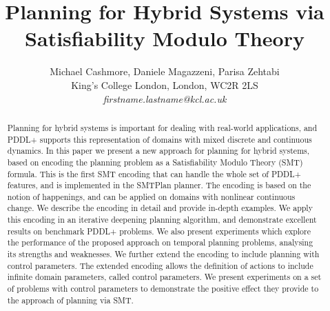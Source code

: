 \documentclass[letterpaper]{article}
\begin{document}
\title{Planning for Hybrid Systems via Satisfiability Modulo Theory}
\author{\center
 Michael Cashmore, Daniele Magazzeni, Parisa Zehtabi \\
King’s College London, London, WC2R 2LS \\
\textit{firstname.lastname@kcl.ac.uk} \\
}
\maketitle


\begin{abstract}
Planning for hybrid systems is important for dealing with real-world applications, and PDDL+ supports this representation of domains with mixed discrete and continuous dynamics.
%
In this paper we present a new approach for planning for hybrid systems, based on encoding the planning problem as a Satisfiability Modulo Theory (SMT) formula. This is the first SMT encoding that can handle the whole set of PDDL+ features, and is implemented in the SMTPlan planner. The encoding is based on the notion of happenings, and can be applied on domains with nonlinear continuous change. We describe the encoding in detail and provide in-depth examples.
%
We apply this encoding in an iterative deepening planning algorithm, and demonstrate excellent results on benchmark PDDL+ problems. We also present experiments which explore the performance of the proposed approach on temporal planning problems, analysing its strengths and weaknesses.
%
We further extend the encoding to include planning with control parameters. The extended encoding allows the definition of actions to include infinite domain parameters, called control parameters. We present experiments on a set of problems with control parameters to demonstrate the positive effect they provide to the approach of planning via SMT.
\end{abstract}













\end{document}
